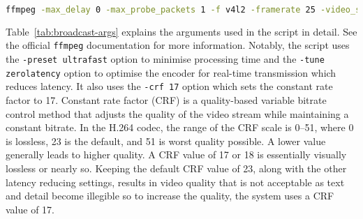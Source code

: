 \begin{lstlisting}[language=bash]
  ffmpeg -max_delay 0 -max_probe_packets 1 -f v4l2 -framerate 25 -video_size 720x576 -threads 1 -i /dev/video0 -vcodec libx264 -pix_fmt:v yuv420p -g:v 1 -preset ultrafast -tune zerolatency -crf 17 -max_delay 0 -fflags +nobuffer -flags low_delay -f rtp -muxdelay 0 rtp://192.168.20.20:42423
\end{lstlisting}

Table~\ref{tab:broadcast-args} explains the arguments used in the script in detail. See the official \texttt{ffmpeg} documentation for more information\cite{ffmpegDocumentation}. Notably, the script uses the \texttt{-preset ultrafast} option to minimise processing time and the \linebreak \texttt{-tune zerolatency} option to optimise the encoder for real-time transmission which reduces latency. It also uses the \texttt{-crf 17} option which sets the constant rate factor to 17. Constant rate factor (CRF) is a quality-based variable bitrate control method that adjusts the quality of the video stream while maintaining a constant bitrate. In the H.264 codec, the range of the CRF scale is 0–51, where 0 is lossless, 23 is the default, and 51 is worst quality possible. A lower value generally leads to higher quality. A CRF value of 17 or 18 is essentially visually lossless or nearly so\cite{ffmpegEncodeH264x2013}. Keeping the default CRF value of 23, along with the other latency reducing settings, results in video quality that is not acceptable as text and detail become illegible so to increase the quality, the system uses a CRF value of 17.

